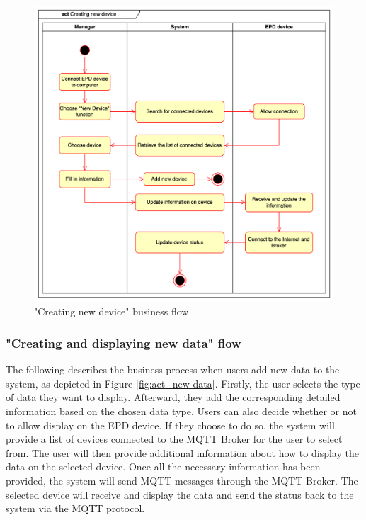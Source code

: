 \documentclass[../Main.tex]{subfiles}
\begin{document}
\begin{figure}[H]
    \centering
    \includegraphics[scale=0.155]{doc/imgs/act_new-device.png}
    \caption{"Creating new device" business flow}
    \label{fig:act_new-device}
\end{figure}

\subsubsection{"Creating and displaying new data" flow}
The following describes the business process when users add new data to the system, as depicted in Figure \ref{fig:act_new-data}. Firstly, the user selects the type of data they want to display. Afterward, they add the corresponding detailed information based on the chosen data type. Users can also decide whether or not to allow display on the \gls{EPD} device. If they choose to do so, the system will provide a list of devices connected to the MQTT Broker for the user to select from. The user will then provide additional information about how to display the data on the selected device. Once all the necessary information has been provided, the system will send MQTT messages through the MQTT Broker. The selected device will receive and display the data and send the status back to the system via the MQTT protocol.
\end{document}
